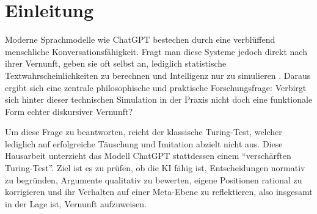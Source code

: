 
\section{Einleitung}

Moderne Sprachmodelle wie ChatGPT bestechen durch eine verblüffend menschliche Konversationsfähigkeit. Fragt man diese Systeme jedoch direkt nach ihrer Vernunft, geben sie oft selbst an, lediglich statistische Textwahrscheinlichkeiten zu berechnen und Intelligenz nur zu simulieren . Daraus ergibt sich eine zentrale philosophische und praktische Forschungsfrage: Verbirgt sich hinter dieser technischen Simulation in der Praxis nicht doch eine funktionale Form echter diskursiver Vernunft?

Um diese Frage zu beantworten, reicht der klassische Turing-Test, welcher lediglich auf erfolgreiche Täuschung und Imitation abzielt nicht aus. Diese Hausarbeit unterzieht das Modell ChatGPT stattdessen einem \enquote{verschärften Turing-Test}. Ziel ist es zu prüfen, ob die KI fähig ist, Entscheidungen normativ zu begründen, Argumente qualitativ zu bewerten, eigene Positionen rational zu korrigieren und ihr Verhalten auf einer Meta-Ebene zu reflektieren, also insgesamt in der Lage ist, Vernunft aufzuweisen.

